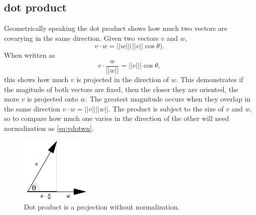 
\subsection{dot product}
\begin{derv*} Geometrically speaking the dot product shows how much two vectors are covarying in the same
direction. Given two vectors $v$ and $w$,
\begin{equation}
   v \cdot w = ||w|| \big(||v||\cos \theta \big).
\end{equation}
When written as 
\begin{equation} \label{eq:vdotwn} %
   v \cdot \frac{w}{||w||} = ||v|||\cos \theta,
\end{equation}
this shows how much $v$ is projected in the direction of $w$. This demonstrates if the magitude of
both vectors are fixed, then the closer they are oriented, the more $v$ is projected onto $w$. The
greatest magnitude occurs when they overlap in the same direction $v \cdot w = ||v||||w||$. The
product is subject to the size of $v$ and $w$, so to compare how much one varies in the direction of
the other will need normalization as \eqref{eq:vdotwn}.
\begin{figure}[H]
   \includegraphics[width=0.3\textwidth, height=0.3\textwidth]{vdotw.png}
   \caption{\label{fig:vdotw}
      Dot product is a projection without normalization.}
\end{figure}
\end{derv*}

